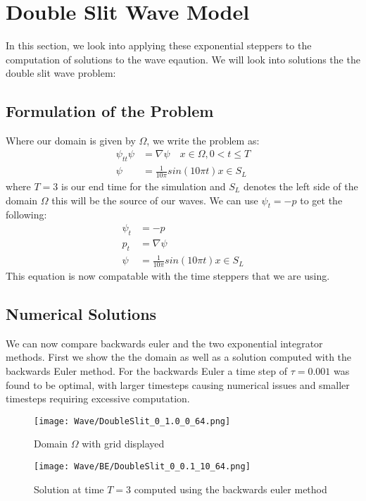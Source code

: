 \section{Double Slit Wave Model}

In this section, we look into applying these exponential steppers to the computation of solutions to the wave eqaution.
We will look into solutions the the double slit wave problem:

\subsection{Formulation of the Problem}
Where our domain is given by $\Omega$, we write the problem as:
\begin{align*}
    \psi_{tt}\psi &= \nabla \psi \quad x \in \Omega, 0<t\leq T\\
    \psi &= \frac{1}{10\pi} sin(10\pi t) x \in S_L
\end{align*}
where $T=3$ is our end time for the simulation and $S_L$ denotes the left side of the domain $\Omega$ this will be the source of our waves.
We can use $\psi_t = -p$ to get the following:
\begin{align*}
    \psi_t &= -p\\
    p_t &= \nabla \psi\\
    \psi &= \frac{1}{10\pi} sin(10\pi t) x \in S_L
\end{align*}
This equation is now compatable with the time steppers that we are using.

\subsection{Numerical Solutions}
We can now compare backwards euler and the two exponential integrator methods.
First we show the the domain as well as a solution computed with the backwards Euler method.
For the backwards Euler a time step of $\tau = 0.001$ was found to be optimal, with larger timesteps causing numerical issues and smaller timesteps requiring excessive computation.

\begin{figure}[H]
    \centering
    \begin{minipage}{0.49\textwidth}
        \texttt{[image: Wave/DoubleSlit\_0\_1.0\_0\_64.png]} %
        \caption{Domain $\Omega$ with grid displayed}
        \label{fig:second order 16}
    \end{minipage}\hfill
    \centering
    \begin{minipage}{0.49\textwidth}
        \texttt{[image: Wave/BE/DoubleSlit\_0\_0.1\_10\_64.png]} %
        \caption{Solution at time $T=3$ computed using the backwards euler method}
        \label{fig:second order 32}
    \end{minipage}\hfill
\end{figure}

